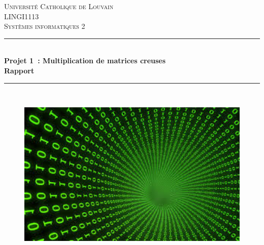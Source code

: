 \documentclass[12pt,a4paper]{article}
\begin{document}
	
\begin{titlepage}
\newcommand{\HRule}{\rule{\linewidth}{0.5mm}} %
\centering %
 
\null
\vspace{2cm}
\textsc{\Large Université Catholique de Louvain}\\[1cm] %
\textsc{\large LINGI1113 \\[0.3cm] Systèmes informatiques 2}\\[0.5cm] %


\HRule \\[0.4cm]
{ \LARGE \bfseries Projet 1~: Multiplication de matrices creuses\\[0.4cm] %
\large \bfseries Rapport} \\[0.4cm]

\HRule \\[0.5cm]
 
\begin{figure}[!h]
	\begin{center}
		\includegraphics[width=15cm]{matrix.jpeg}
	\end{center}
\end{figure}



\end{titlepage}
\end{document}
